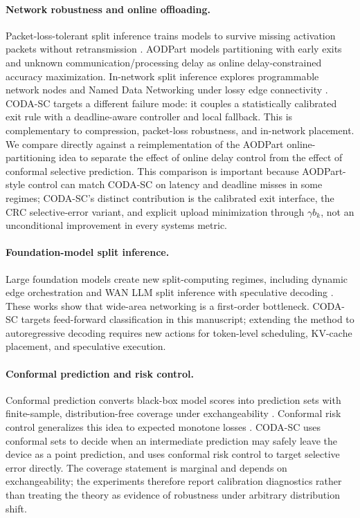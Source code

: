 \documentclass[11pt]{article}
\begin{document}
\paragraph{Network robustness and online offloading.}
Packet-loss-tolerant split inference trains models to survive missing activation
packets without retransmission \citep{itahara2021packet}. AODPart
\citep{saxena2025aodpart} models partitioning with early exits and unknown
communication/processing delay as online delay-constrained accuracy
maximization. In-network split inference explores programmable network nodes and
Named Data Networking under lossy edge connectivity \citep{ndn2025split}. CODA-SC
targets a different failure mode: it couples a statistically calibrated exit rule
with a deadline-aware controller and local fallback. This is complementary to
compression, packet-loss robustness, and in-network placement. We compare
directly against a reimplementation of the AODPart online-partitioning idea to
separate the effect of online delay control from the effect of conformal
selective prediction. This comparison is important because AODPart-style control
can match CODA-SC on latency and deadline misses in some regimes; CODA-SC's
distinct contribution is the calibrated exit interface, the CRC selective-error
variant, and explicit upload minimization through $\gamma b_k$, not an
unconditional improvement in every systems metric.

\paragraph{Foundation-model split inference.}
Large foundation models create new split-computing regimes, including dynamic
edge orchestration \citep{koch2025adaptive} and WAN LLM split inference with
speculative decoding \citep{cunningham2026privacy}. These works show that
wide-area networking is a first-order bottleneck. CODA-SC targets feed-forward
classification in this manuscript; extending the method to autoregressive
decoding requires new actions for token-level scheduling, KV-cache placement, and
speculative execution.

\paragraph{Conformal prediction and risk control.}
Conformal prediction converts black-box model scores into prediction sets with
finite-sample, distribution-free coverage under exchangeability
\citep{angelopoulos2021gentle}. Conformal risk control generalizes this idea to
expected monotone losses \citep{angelopoulos2024crc}. CODA-SC uses conformal
sets to decide when an intermediate prediction may safely leave the device as a
point prediction, and uses conformal risk control to target selective error
directly. The coverage statement is marginal and depends on exchangeability; the
experiments therefore report calibration diagnostics rather than treating the
theory as evidence of robustness under arbitrary distribution shift.
\end{document}
